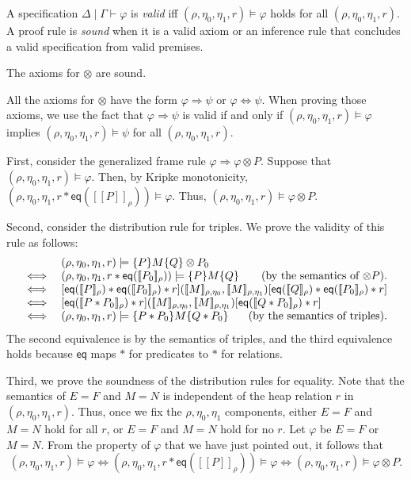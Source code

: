 \documentclass{LMCS}
\newcommand{\ff}[1]{[\![#1]\!]}
\newcommand{\mtri}[3]{\{{#1}\}{#2}\{{#3}\}}
\newcommand{\squad}[4]{{[{#1}]}
                        ({#2},  {#3})
                       {[{#4}]}}
\newcommand{\EQ}{\mathsf{eq}}
\begin{document}
A specification $\Delta \mid \Gamma \vdash \varphi$ is \emph{valid}
iff $(\rho,\eta_0,\eta_1,r) \models \varphi$ holds
for all $(\rho,\eta_0,\eta_1,r)$.
A proof rule is \emph{sound}
when it is a valid axiom or an inference rule that concludes
a valid specification from valid premises.

\begin{lem}\label{lemma:axiom-extension}
The axioms for $\otimes$ are sound.
\end{lem}
\proof
All the axioms for $\otimes$ have the form
$\varphi \Rightarrow \psi$ or 
$\varphi \Leftrightarrow \psi$. When proving
those axioms, we use
the fact that $\varphi \Rightarrow \psi$ is valid
if and only if $(\rho,\eta_0,\eta_1,r) \models \varphi$
implies $(\rho,\eta_0,\eta_1,r) \models \psi$
for all $(\rho,\eta_0,\eta_1,r)$. 

First, consider the generalized frame rule 
$\varphi \Rightarrow \varphi \otimes P$. Suppose
that $(\rho,\eta_0,\eta_1,r) \models \varphi$. Then,
by Kripke monotonicity, 
$(\rho,\eta_0,\eta_1,r*\EQ(\ff{P}_\rho)) \models \varphi$.
Thus, $(\rho,\eta_0,\eta_1,r) \models \varphi \otimes P$.

Second, consider the distribution rule for triples.
We prove the validity of this rule as follows:
$$
\begin{array}{ll}
& (\rho,\eta_0,\eta_1,r) \models \mtri{P}{M}{Q} \otimes P_0
\\
\iff
&
(\rho,\eta_0,\eta_1,r*\EQ(\ff{P_0}_\rho)) \models \mtri{P}{M}{Q} 
\hfill
\quad(\mbox{by the semantics of $\otimes P$}).
\\
\iff
&  \squad
        {\EQ(\ff{P}_\rho)*\EQ(\ff{P_0}_\rho)*r}
        {\ff{M}_{\rho,\eta_0}}
        {\ff{M}_{\rho,\eta_1}}
        {\EQ(\ff{Q}_\rho)*\EQ(\ff{P_0}_\rho)*r}
\\
\iff
& \squad
        {\EQ(\ff{P*P_0}_\rho)*r}
        {\ff{M}_{\rho,\eta_0}}
        {\ff{M}_{\rho,\eta_1}}
        {\EQ(\ff{Q*P_0}_\rho)*r}
\\
\iff
& (\rho,\eta_0,\eta_1,r) \models \mtri{P*P_0}{M}{Q*P_0}
\hfill
\quad(\mbox{by the semantics of triples}).
\end{array}
$$
The second equivalence is by the semantics of triples,
and the third equivalence holds because $\EQ$ maps
$*$ for predicates to $*$ for relations.

Third, we prove the soundness of the distribution rules
for equality. Note that the semantics of $E=F$ and $M=N$
is independent of the heap relation $r$ in 
$(\rho,\eta_0,\eta_1,r)$. Thus, once we
fix the $\rho,\eta_0,\eta_1$ components, either
$E=F$ and $M=N$  hold for all $r$,
or $E=F$ and $M=N$  hold for no $r$.
Let $\varphi$ be $E=F$ or $M=N$. From the property of
$\varphi$ that we have just pointed out, it follows that
$$
  (\rho,\eta_0,\eta_1,r) \models \varphi
\iff
  (\rho,\eta_0,\eta_1,r*\EQ(\ff{P}_\rho)) \models \varphi
\iff
  (\rho,\eta_0,\eta_1,r) \models \varphi \otimes P.
$$
\end{document}
